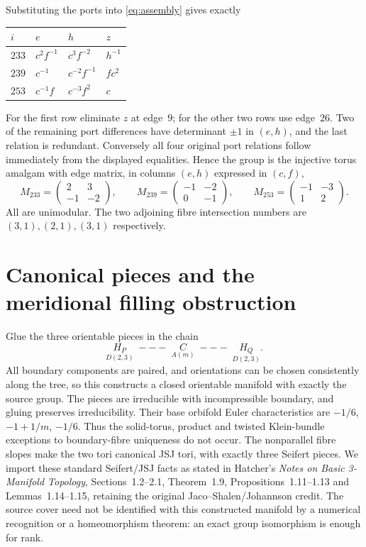 \documentclass[11pt]{article}
\begin{document}
Substituting the ports into \eqref{eq:assembly} gives exactly
\begin{center}
\begin{tabular}{llll}
\toprule
$i$ & $e$ & $h$ & $z$\\
\midrule
$233$ & $c^2f^{-1}$ & $c^3f^{-2}$ & $h^{-1}$\\
$239$ & $c^{-1}$ & $c^{-2}f^{-1}$ & $fc^2$\\
$253$ & $c^{-1}f$ & $c^{-3}f^2$ & $c$\\
\bottomrule
\end{tabular}
\end{center}
For the first row eliminate $z$ at edge~$9$; for the other two rows use
edge~$26$. Two of the remaining port differences have determinant
$\pm1$ in $(e,h)$, and the last relation is redundant. Conversely all
four original port relations follow immediately from the displayed
equalities. Hence the group is the injective torus amalgam with edge
matrix, in columns $(e,h)$ expressed in $(c,f)$,
\[
 M_{233}=\begin{pmatrix}2&3\\-1&-2\end{pmatrix},\qquad
 M_{239}=\begin{pmatrix}-1&-2\\0&-1\end{pmatrix},\qquad
 M_{253}=\begin{pmatrix}-1&-3\\1&2\end{pmatrix}.
\]
All are unimodular. The two adjoining fibre intersection numbers are
$(3,1),(2,1),(3,1)$ respectively.

\section{Canonical pieces and the meridional filling obstruction}

Glue the three orientable pieces in the chain
\[
 \underset{D(2,3)}{H_P}\;---\;
 \underset{A(m)}{C}\;---\;
 \underset{D(2,3)}{H_Q}.
\]
All boundary components are paired, and orientations can be chosen
consistently along the tree, so this constructs a closed orientable
manifold with exactly the source group. The pieces are irreducible with
incompressible boundary, and gluing preserves irreducibility. Their base
orbifold Euler characteristics are $-1/6$, $-1+1/m$, $-1/6$.
Thus the solid-torus, product and twisted Klein-bundle exceptions to
boundary-fibre uniqueness do not occur. The nonparallel fibre slopes make
the two tori canonical JSJ tori, with exactly three Seifert pieces.
We import these standard Seifert/JSJ facts as stated in Hatcher's
\emph{Notes on Basic 3-Manifold Topology}, Sections~1.2--2.1,
Theorem~1.9, Propositions~1.11--1.13 and Lemmas~1.14--1.15, retaining
the original Jaco--Shalen/Johannson credit. The source cover need not be
identified with this constructed manifold by a numerical recognition
or a homeomorphism theorem: an exact group isomorphism is enough for rank.
\end{document}
